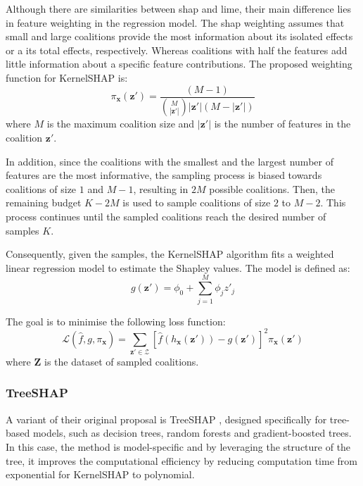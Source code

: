 Although there are similarities between \acrshort{shap} and \acrshort{lime}, their main difference lies in feature weighting in the regression model. The \acrshort{shap} weighting assumes that small and large coalitions provide the most information about its isolated effects or a its total effects, respectively. Whereas coalitions with half the features add little information about a specific feature contributions. The proposed weighting function for KernelSHAP is:
\begin{equation}
    \pi_\mathbf{x} (\mathbf{z}') = \frac{(M - 1)}{\binom{M}{|\mathbf{z}'|} |\mathbf{z}'| \left(M - |\mathbf{z}'|\right)}
\end{equation}
where $M$ is the maximum coalition size and $|\mathbf{z}'|$ is the number of features in the coalition $\mathbf{z}'$.

In addition, since the coalitions with the smallest and the largest number of features are the most informative, the sampling process is biased towards coalitions of size $1$ and $M-1$, resulting in $2M$ possible coalitions. Then, the remaining budget $K - 2M$ is used to sample coalitions of size $2$ to $M-2$. This process continues until the sampled coalitions reach the desired number of samples $K$.

Consequently, given the samples, the KernelSHAP algorithm fits a weighted linear regression model to estimate the Shapley values. The model is defined as:
\begin{equation}
    g(\mathbf{z}') = \phi_0 + \sum_{j=1}^{M} \phi_j z'_j
\end{equation}

The goal is to minimise the following loss function:
\begin{equation}
    \mathcal{L}(\hat{f}, g, \pi_{\mathbf{x}}) = \sum_{\mathbf{z}' \in \mathcal{Z}} \left[\hat{f} \left(h_{\mathbf{x}}\left(\mathbf{z}'\right)\right) - g(\mathbf{z}')\right]^2 \pi_{\mathbf{x}}(\mathbf{z}')
\end{equation}
where $\mathbf{Z}$ is the dataset of sampled coalitions. 

\subsubsection{TreeSHAP} \label{sec:treeshap}

A variant of their original proposal is TreeSHAP \cite{Lundberg2019}, designed specifically for tree-based models, such as decision trees, random forests and gradient-boosted trees. In this case, the method is model-specific and by leveraging the structure of the tree, it improves the computational efficiency by reducing computation time from exponential for KernelSHAP to polynomial. 

